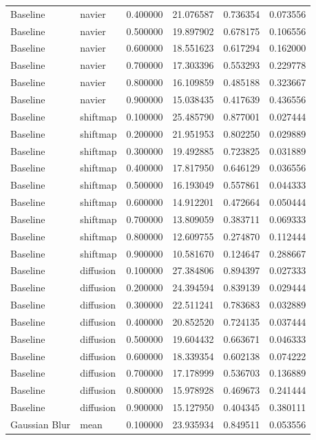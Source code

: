 \begin{table}[h]
\begin{tabular}{llrrrr}
Baseline & navier & 0.400000 & 21.076587 & 0.736354 & 0.073556 \\
Baseline & navier & 0.500000 & 19.897902 & 0.678175 & 0.106556 \\
Baseline & navier & 0.600000 & 18.551623 & 0.617294 & 0.162000 \\
Baseline & navier & 0.700000 & 17.303396 & 0.553293 & 0.229778 \\
Baseline & navier & 0.800000 & 16.109859 & 0.485188 & 0.323667 \\
Baseline & navier & 0.900000 & 15.038435 & 0.417639 & 0.436556 \\
Baseline & shiftmap & 0.100000 & 25.485790 & 0.877001 & 0.027444 \\
Baseline & shiftmap & 0.200000 & 21.951953 & 0.802250 & 0.029889 \\
Baseline & shiftmap & 0.300000 & 19.492885 & 0.723825 & 0.031889 \\
Baseline & shiftmap & 0.400000 & 17.817950 & 0.646129 & 0.036556 \\
Baseline & shiftmap & 0.500000 & 16.193049 & 0.557861 & 0.044333 \\
Baseline & shiftmap & 0.600000 & 14.912201 & 0.472664 & 0.050444 \\
Baseline & shiftmap & 0.700000 & 13.809059 & 0.383711 & 0.069333 \\
Baseline & shiftmap & 0.800000 & 12.609755 & 0.274870 & 0.112444 \\
Baseline & shiftmap & 0.900000 & 10.581670 & 0.124647 & 0.288667 \\
Baseline & diffusion & 0.100000 & 27.384806 & 0.894397 & 0.027333 \\
Baseline & diffusion & 0.200000 & 24.394594 & 0.839139 & 0.029444 \\
Baseline & diffusion & 0.300000 & 22.511241 & 0.783683 & 0.032889 \\
Baseline & diffusion & 0.400000 & 20.852520 & 0.724135 & 0.037444 \\
Baseline & diffusion & 0.500000 & 19.604432 & 0.663671 & 0.046333 \\
Baseline & diffusion & 0.600000 & 18.339354 & 0.602138 & 0.074222 \\
Baseline & diffusion & 0.700000 & 17.178999 & 0.536703 & 0.136889 \\
Baseline & diffusion & 0.800000 & 15.978928 & 0.469673 & 0.241444 \\
Baseline & diffusion & 0.900000 & 15.127950 & 0.404345 & 0.380111 \\
Gaussian Blur & mean & 0.100000 & 23.935934 & 0.849511 & 0.053556 \\

\end{tabular}
\end{table}
